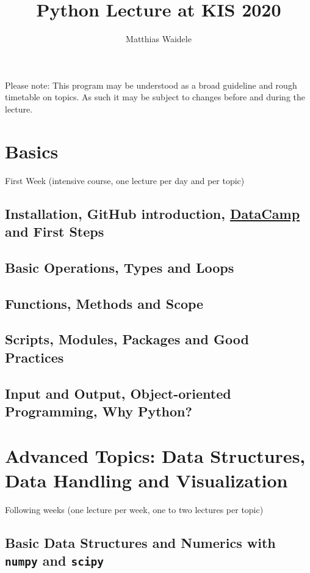 \documentclass[10pt,a4paper]{article}
\begin{document}
	\title{Python Lecture at KIS 2020}
	\author{Matthias Waidele}
	\date{}
	
	\maketitle
	Please note: This program may be understood as a broad guideline and rough timetable on topics. As such it may be subject to changes before and during the lecture.
	
	\section{Basics}
	First Week (intensive course, one lecture per day and per topic)
	
		\subsection{Installation, GitHub introduction, \href{https://learn.datacamp.com/}{DataCamp} and First Steps}
		\subsection{Basic Operations, Types and Loops}
		\subsection{Functions, Methods and Scope}
		\subsection{Scripts, Modules, Packages and Good Practices}
		\subsection{Input and Output, Object-oriented Programming, Why Python?}
	
	\vspace{1cm}
	\section{Advanced Topics: Data Structures, Data Handling and Visualization}
	Following weeks (one lecture per week, one to two lectures per topic)
		
		\subsection{Basic Data Structures and Numerics with \texttt{numpy} and \texttt{scipy}}
\end{document}
